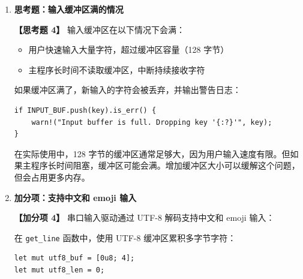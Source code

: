 \documentclass{SYSUReport}
\begin{document}
\begin{enumerate}[label={\chinese*、},labelsep=0pt, start=8]
    与用户态多线程不同，中断导致的"并发访问"是强制性的：
    \begin{enumerate}
        \item 主程序持有串口锁进行日志输出
        \item 中断触发，强制打断主程序
        \item 中断处理程序尝试获取串口锁读取数据
        \item 由于锁已被持有，中断处理程序等待
        \item 但主程序被中断打断，无法释放锁
        \item 形成死锁：中断等待锁，锁持有者被中断打断
    \end{enumerate}

    这就是为什么在中断处理程序中应该做尽量少的事，避免调用可能获取锁的函数。在本实验中，\texttt{receive} 函数通过 \texttt{get\_serial} 获取串口引用，如果串口驱动使用互斥锁保护，这里可能会死锁。实际实现中，\texttt{get\_serial} 返回的是 \texttt{Option}，如果无法获取锁则返回 \texttt{None}，避免了死锁。

    \item \textbf{思考题：输入缓冲区满的情况}

    \textbf{【思考题 4】} 输入缓冲区在以下情况下会满：
    \begin{itemize}
        \item 用户快速输入大量字符，超过缓冲区容量（128 字节）
        \item 主程序长时间不读取缓冲区，中断持续接收字符
    \end{itemize}

    如果缓冲区满了，新输入的字符会被丢弃，并输出警告日志：
    \begin{verbatim}
if INPUT_BUF.push(key).is_err() {
    warn!("Input buffer is full. Dropping key '{:?}'", key);
}
    \end{verbatim}

    在实际使用中，128 字节的缓冲区通常足够大，因为用户输入速度有限。但如果主程序长时间阻塞，缓冲区可能会满。增加缓冲区大小可以缓解这个问题，但会占用更多内存。

    \item \textbf{加分项：支持中文和 emoji 输入}

    \textbf{【加分项 4】} 串口输入驱动通过 UTF-8 解码支持中文和 emoji 输入：

    在 \texttt{get\_line} 函数中，使用 UTF-8 缓冲区累积多字节字符：
    \begin{verbatim}
let mut utf8_buf = [0u8; 4];
let mut utf8_len = 0;


\end{verbatim}
\end{enumerate}
\end{document}

